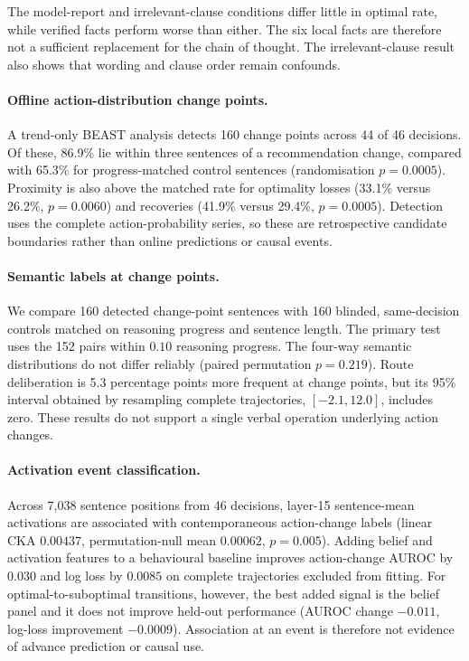 \documentclass{article}
\begin{document}
The model-report and irrelevant-clause conditions differ little in optimal
rate, while verified facts perform worse than either. The six local facts are
therefore not a sufficient replacement for the chain of thought. The
irrelevant-clause result also shows that wording and clause order remain
confounds.

\paragraph{Offline action-distribution change points.}
A trend-only BEAST analysis detects 160 change points across 44 of 46 decisions.
Of these, 86.9\% lie within three sentences of a recommendation change, compared
with 65.3\% for progress-matched control sentences (randomisation
$p=0.0005$). Proximity is also above the matched rate for optimality losses
(33.1\% versus 26.2\%, $p=0.0060$) and recoveries (41.9\% versus 29.4\%,
$p=0.0005$). Detection uses the complete action-probability series, so these
are retrospective candidate boundaries rather than online predictions or
causal events.

\paragraph{Semantic labels at change points.}
We compare 160 detected change-point sentences with 160 blinded, same-decision
controls matched on reasoning progress and sentence length. The primary test
uses the 152 pairs within $0.10$ reasoning progress. The four-way semantic
distributions do not differ reliably (paired permutation $p=0.219$). Route
deliberation is 5.3 percentage points more frequent at change points, but its
95\% interval obtained by resampling complete trajectories,
$[-2.1,12.0]$, includes zero. These
results do not support a single verbal operation underlying action changes.

\paragraph{Activation event classification.}
Across 7,038 sentence positions from 46 decisions, layer-15 sentence-mean
activations are associated with contemporaneous action-change labels (linear
CKA $0.00437$, permutation-null mean $0.00062$, $p=0.005$). Adding belief
and activation features to a behavioural baseline improves action-change
AUROC by $0.030$ and log loss by $0.0085$ on complete trajectories excluded
from fitting. For
optimal-to-suboptimal transitions, however, the best added signal is the belief
panel and it does not improve held-out performance (AUROC change $-0.011$,
log-loss improvement $-0.0009$). Association at an event is therefore not
evidence of advance prediction or causal use.
\end{document}
